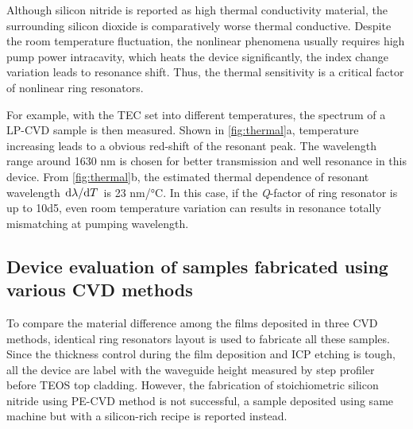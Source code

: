 \begin{figure}
	\centering
	
	\label{fig:thermal}
\end{figure}

Although silicon nitride is reported as high thermal conductivity material, the surrounding silicon dioxide is comparatively worse thermal conductive. Despite the room temperature fluctuation, the nonlinear phenomena usually requires high pump power intracavity, which heats the device significantly, the index change variation leads to resonance shift. Thus, the thermal sensitivity is a critical factor of nonlinear ring resonators.

For example, with the TEC set into different temperatures, the spectrum of a LP-CVD sample is then measured. Shown in \autoref{fig:thermal}a, temperature increasing leads to a obvious red-shift of the resonant peak. The wavelength range around 1630 nm is chosen for better transmission and well resonance in this device. From \autoref{fig:thermal}b, the estimated thermal dependence of resonant wavelength $\dv*{\lambda}{T}$ is 23 \si{\nm/\celsius}. In this case, if the \textit{Q}-factor of ring resonator is up to \num{10d5}, even room temperature variation can results in resonance totally mismatching at pumping wavelength.

\subsection{Device evaluation of samples fabricated using various CVD methods}






To compare the material difference among the films deposited in three CVD methods, identical ring resonators layout is used to fabricate all these samples. %
Since the thickness control during the film deposition and ICP etching is tough, all the device are label with the waveguide height measured by step profiler before TEOS top cladding. However, the fabrication of stoichiometric silicon nitride using PE-CVD method is not successful, a sample deposited using same machine but with a silicon-rich recipe is reported instead. 

